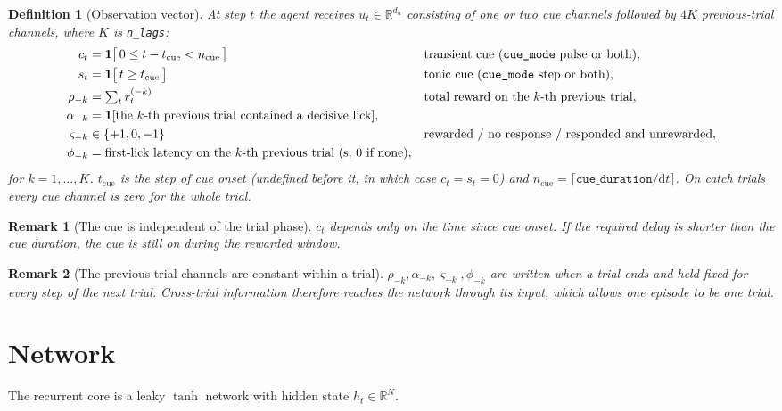 \documentclass[11pt]{article}
\newtheorem{definition}{Definition}
\newtheorem{remark}{Remark}
\newcommand{\R}{\mathbb{R}}
\newcommand{\1}{\mathbf{1}}
\begin{document}
\begin{definition}[Observation vector]
At step $t$ the agent receives $u_t \in \R^{d_u}$ consisting of one or two cue channels
followed by $4K$ previous-trial channels, where $K$ is \texttt{n\_lags}:
\begin{align}
  c_t        &= \1\bigl[\,0 \le t - t_{\mathrm{cue}} < n_{\mathrm{cue}}\,\bigr]
    && \text{transient cue (\texttt{cue\_mode} pulse or both)}, \\
  s_t        &= \1\bigl[\, t \ge t_{\mathrm{cue}}\,\bigr]
    && \text{tonic cue (\texttt{cue\_mode} step or both)}, \\
  \rho_{-k}  &= \textstyle\sum_{t} r_t^{(-k)}
    && \text{total reward on the $k$-th previous trial}, \\
  \alpha_{-k}    &= \1[\text{the $k$-th previous trial contained a decisive lick}], \\
  \varsigma_{-k} &\in \{+1, 0, -1\}
    && \text{rewarded / no response / responded and unrewarded}, \\
  \phi_{-k}      &= \text{first-lick latency on the $k$-th previous trial (s; 0 if none)},
\end{align}
for $k = 1,\dots,K$. $t_{\mathrm{cue}}$ is the step of cue onset (undefined before it, in
which case $c_t = s_t = 0$) and $n_{\mathrm{cue}} = \lceil \texttt{cue\_duration}/\mathrm{d}t
\rceil$. On catch trials every cue channel is zero for the whole trial.
\end{definition}

\begin{remark}[The cue is independent of the trial phase]
$c_t$ depends only on the time since cue onset. If the required delay is shorter than the
cue duration, the cue is still on during the rewarded window.
\end{remark}

\begin{remark}[The previous-trial channels are constant within a trial]
$\rho_{-k},\alpha_{-k},\varsigma_{-k},\phi_{-k}$ are written when a trial ends and held
fixed for every step of the next trial. Cross-trial information therefore reaches the
network through its input, which allows one episode to be one trial.
\end{remark}

\section{Network}\label{sec:net}

The recurrent core is a leaky $\tanh$ network with hidden state $h_t \in \R^{N}$.
\end{document}
